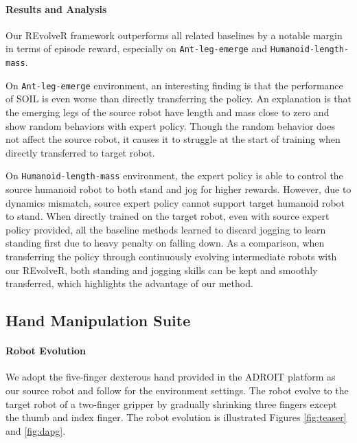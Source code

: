 \documentclass[nohyperref]{article}
\theoremstyle{plain}
\theoremstyle{definition}
\theoremstyle{remark}
\begin{document}
\paragraph{Results and Analysis}
Our REvolveR framework outperforms all related baselines by a notable margin in terms of episode reward, especially on \texttt{Ant-leg-emerge} and \texttt{Humanoid-length-mass}.




On \texttt{Ant-leg-emerge} environment, an interesting finding is that the performance of SOIL is even worse than directly transferring the policy.
An explanation is that the emerging legs of the source robot have length and mass close to zero and show random behaviors with expert policy.
Though the random behavior does not affect the source robot, it causes it to struggle at the start of training when directly transferred to target robot.  

On \texttt{Humanoid-length-mass} environment, the expert policy is able to control the source humanoid robot to both stand and jog for higher rewards.
However, due to dynamics mismatch, source expert policy cannot support target humanoid robot to stand.
When directly trained on the target robot, even with source expert policy provided, all the baseline methods learned to discard jogging to learn standing first  due to heavy penalty on falling down.
As a comparison, when transferring the policy through continuously evolving intermediate robots with our REvolveR, both standing and jogging skills can be kept and smoothly transferred, which highlights the advantage of our method.






\subsection{Hand Manipulation Suite}\label{sec:dapg:exp}

\paragraph{Robot Evolution}

We adopt the five-finger dexterous hand provided in the ADROIT platform \cite{adroit} as our source robot and follow \citet{dapg} for the environment settings.
The robot evolve to the target robot of a two-finger gripper by gradually shrinking three fingers except the thumb and index finger.
The robot evolution is illustrated Figures \ref{fig:teaser} and \ref{fig:dapg}.
\end{document}

